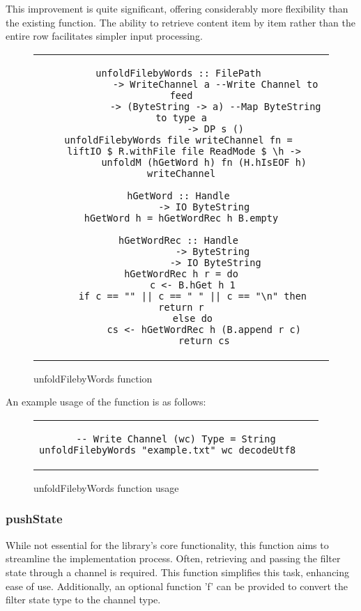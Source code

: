 This improvement is quite significant, offering considerably more flexibility than the existing function.
The ability to retrieve content item by item rather than the entire row facilitates simpler input processing.
\begin{figure}[H]
    \begin{tabular}{c}
        \begin{lstlisting}
unfoldFilebyWords :: FilePath 
            -> WriteChannel a --Write Channel to feed
            -> (ByteString -> a) --Map ByteString to type a
            -> DP s ()
unfoldFilebyWords file writeChannel fn = 
  liftIO $ R.withFile file ReadMode $ \h -> 
        unfoldM (hGetWord h) fn (H.hIsEOF h) writeChannel

hGetWord :: Handle 
        -> IO ByteString
hGetWord h = hGetWordRec h B.empty

hGetWordRec :: Handle 
            -> ByteString 
            -> IO ByteString
hGetWordRec h r = do
    c <- B.hGet h 1
    if c == "" || c == " " || c == "\n" then return r
    else do
        cs <- hGetWordRec h (B.append r c)
        return cs
        \end{lstlisting}
    \end{tabular}
    \caption[{[Code]} unfoldFilebyWords definition]{unfoldFilebyWords function}
    \label{fig:HC22}
\end{figure}

An example usage of the function is as follows:

\begin{figure}[H]
    \begin{tabular}{c}
        \begin{lstlisting}
-- Write Channel (wc) Type = String
unfoldFilebyWords "example.txt" wc decodeUtf8	
        \end{lstlisting}
    \end{tabular}
    \caption[{[Code]} unfoldFilebyWords example]{unfoldFilebyWords function usage}
    \label{fig:HC22b}
\end{figure}

\subsubsection*{pushState}
While not essential for the library's core functionality, this function aims to streamline the implementation process.
Often, retrieving and passing the filter state through a channel is required.
This function simplifies this task, enhancing ease of use.
Additionally, an optional function 'f' can be provided to convert the filter state type to the channel type.

